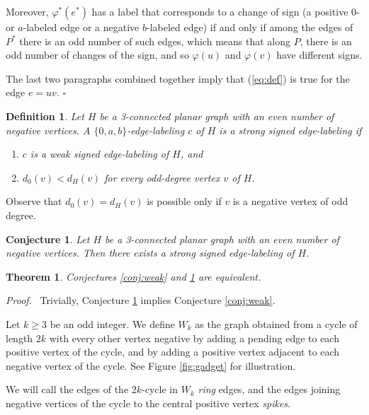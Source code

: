 \documentclass[12pt]{article}
\newtheorem{theorem}{Theorem}
\newtheorem{definition}{Definition}
\newtheorem{conjecture}{Conjecture}
\newcommand{\pf}{{{\it Proof.}\ }}
\newcommand{\ep}{\hfill$\square$}
\begin{document}
Moreover, $\varphi^*(e^*)$ has a label that corresponds to a change of sign (a positive $0$- or $a$-labeled edge or a negative $b$-labeled edge) if and only if among the edges of $P^*$ there is an odd number of such edges, which means that along $P$, there is an odd number of changes of the sign, and so $\varphi(u)$ and $\varphi(v)$ have different signs.

The last two paragraphs combined together imply that (\ref{eq:def}) is true for the edge $e=uv$.
\ep

\begin{definition}
Let $H$ be a 3-connected planar graph with an even number of negative vertices. A $\{0,a,b\}$-edge-labeling $c$ of $H$ is a \emph{strong signed edge-labeling} if 
\begin{enumerate}
    \item[(i)] $c$ is a weak signed edge-labeling of $H$, and
    \item[(ii)] $d_0(v) < d_H(v)$ for every odd-degree vertex $v$ of $H$.
\end{enumerate}
\end{definition}

Observe that $d_0(v) = d_H(v)$ is possible only if $v$ is a negative vertex of odd degree.

\begin{conjecture}
Let $H$ be a 3-connected planar graph with an even number of negative vertices. Then there exists a strong signed edge-labeling of $H$.
\label{conj:strong_labeling}
\end{conjecture}

\begin{theorem}
    Conjectures \ref{conj:weak} and \ref{conj:strong_labeling} are equivalent.
    \label{th:equiv_weak_strong}
\end{theorem}

\pf
Trivially, Conjecture \ref{conj:strong_labeling} implies Conjecture \ref{conj:weak}.


Let $k\ge 3$ be an odd integer. We define $W_k$ as the graph obtained from a cycle of length $2k$ with every other vertex negative by adding a pending edge to each positive vertex of the cycle, and by adding a positive vertex adjacent to each negative vertex of the cycle. See Figure \ref{fig:gadget} for illustration.

We will call the edges of the $2k$-cycle in $W_k$ \emph{ring} edges, and the edges joining negative vertices of the cycle to the central positive vertex \emph{spikes}.
\end{document}
